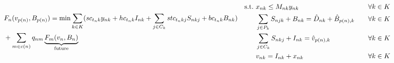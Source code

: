 \documentclass[10pt]{article}
\newcommand{\ti}{t} %
\newcommand{\ka}{k} %
\newcommand{\KA}{K}
\newcommand{\jey}{j} %
\newcommand{\Bi}{B} %
\newcommand{\Vi}{v} %
\newcommand{\Es}{S} %
\newcommand{\Zed}{z} %
\newcommand{\x}{x} %
\newcommand{\y}{y} %
\begin{document}
\begin{subequations}
\label{DynamicProgramming}
\begin{flalign}
&F_{n}(\Vi_{p(n)},\Bi_{p(n)}) =  \min  \sum_{\ka \in \KA} ( sc_{\ti_n \ka}\y_{n \ka} +  hc_{\ti_n \ka} {I}_{n \ka}+  \sum_{j\in C_{\ka }}stc_{\ti_n \ka \jey} \Es_{n  \ka \jey}  + bc_{\ti_n \ka} {\Bi}_{n \ka} )& \notag \\ 
& + \sum_{m \in c(n)}  q_{nm} \underbrace{ F_{m}(\Vi_{n}, {\Bi_{n}} ) }_{\text{future}} & \label{eq:Dyn_g2_Sub_ST_Production_Flow} 
\end{flalign}

\begin{flalign}
\text{s.t.} \ & \x_{n \ka} \leq M_{n \ka} \y_{n \ka} \quad  &\forall \ka  \in \KA  & \label{eq:Dyn_Sub_Setup}\\
& \sum_{j\in P_{k}} {S}_{n \jey \ka} + \Bi_{n  \ka}  = \hat{D}_{n \ka} + \hat{\Bi}_{p(n), \ka} \quad &\forall \ka  \in \KA \label{eq:Bhat} \\
& \sum_{j\in C_{k}} {S}_{n \ka \jey} + I_{n \ka} = \hat{\Vi}_{p(n), \ka}  \quad &\forall \ka  \in \KA \label{eq:vhat}\\
& \Vi_{n \ka} = I_{n  \ka} + \x_{n  \ka}  \quad &\forall \ka  \in \KA  \label{eq:vdef}

\end{flalign}
\end{subequations}
\end{document}
